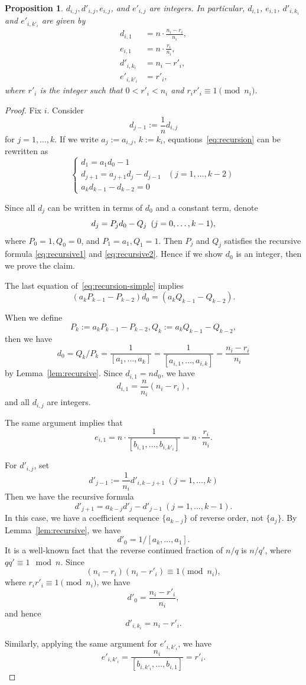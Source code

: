 \documentclass[10pt,a4paper,reqno]{amsart}
\newtheorem{prop}[thm]{Proposition}
\theoremstyle{definition}
\numberwithin{equation}{section}
\numberwithin{figure}{section}
\begin{document}
\begin{prop} \label{prop:integers}
$d_{i,j}, d'_{i,j}, e_{i,j}$, and $e'_{i,j}$ are integers.
In particular, $d_{i,1}$, $e_{i,1}$, $d'_{i,k_i}$ and $e'_{i,k'_i}$ are given by
\begin{align*}
d_{i,1}&=n\cdot \frac{n_i-r_i}{n_i}, \\
e_{i,1}&=n\cdot \frac{r_i}{n_i}, \\
d'_{i,k_i}&={n_i-r'_i}, \\
e'_{i,k'_i}&={r'_i},
\end{align*}
where $r'_i$ is the integer such that $0< r'_i < n_i$ and $r_i r'_i\equiv 1 \pmod{n_i}$.
\end{prop}

\begin{proof}
Fix $i$. 
Consider \[d_{j-1}:=\frac{1}{n}d_{i,j}\]
for $j=1,\dots, k$.
If we write $a_j:=a_{i,j}$, $k:=k_i$, equations~\eqref{eq:recursion} can be rewritten as
\begin{equation} \label{eq:recursion-simple}
\begin{cases}
d_{1}=a_{1}d_{0}-1&  \\
d_{j+1}=a_{j+1}d_{j}-d_{j-1} & (j=1,\dots,k-2) \\
a_{k} d_{k-1}-d_{k-2}=0 &
\end{cases}
\end{equation}

Since all $d_j$ can be written in terms of $d_0$ and a constant term, 
denote \[d_j=P_j d_0-Q_j \hspace{0.5em}(j=0,\dots,k-1),\] where $P_0=1, Q_0=0$, and $P_1=a_1, Q_1=1$.
Then $P_j$ and $Q_j$ satisfies the recursive formula \eqref{eq:recursive1} and \eqref{eq:recursive2}.
Hence if we show $d_0$ is an integer, then we prove the claim.

The last equation of~\eqref{eq:recursion-simple} implies
\[(a_kP_{k-1}-P_{k-2})d_0=(a_k Q_{k-1}-Q_{k-2}).\]

When we define \[P_k:=a_k P_{k-1}-P_{k-2}, Q_k:= a_k Q_{k-1}-Q_{k-2},\] 
then we have \[d_0=Q_k/P_k=\frac{1}{[a_1,\dots, a_k]}=\frac{1}{[a_{i,1},\dots, a_{i,k}]}=\frac{n_i-r_i}{n_i}\] by Lemma~\ref{lem:recursive}.
Since $d_{i,1}=n d_0$, we have \[d_{i,1}=\frac{n}{n_i}(n_i-r_i),\]
and all $d_{i,j}$ are integers.

The same argument implies that
\[e_{i,1}=n \cdot \frac{1}{\left[b_{i,1},\dots, b_{i,k'_i}\right]}=n\cdot \frac{r_i}{n_i}.\]

For $d'_{i,j}$, set
 \[d'_{j-1}:=\frac{1}{n_i}d'_{i,k-j+1} ~(j=1,\dots,k)\] 
Then we have the recursive formula \[d'_{j+1}=a_{k-j}d'_{j}-d'_{j-1} ~(j=1,\dots, k-1).\]
In this case, we have a coefficient sequence $\{a_{k-j}\}$ of reverse order, not $\{a_j\}$.
By Lemma~\ref{lem:recursive}, we have \[d'_0=1/\left[a_k,\dots, a_1\right].\] 
It is a well-known fact that the reverse continued fraction of $n/q$ is $n/q'$, where $qq'\equiv 1 \mod n$.
Since \[(n_i-r_i)(n_i-r'_i) \equiv 1 \pmod{n_i},\] where $r_i r'_i\equiv 1 \pmod{n_i}$,
we have \[d'_{0}=\frac{n_i-r'_i}{n_i},\] and hence
\[d'_{i,k_i}=n_i-r'_i.\]

Similarly, applying the same argument for $e'_{i,k'_i}$, we have \[e'_{i,k'_i}=\frac{n_i}{\left[b_{i,k'_i},\dots, b_{i,1}\right]}={r'_i}.\]
\end{proof}
\end{document}
